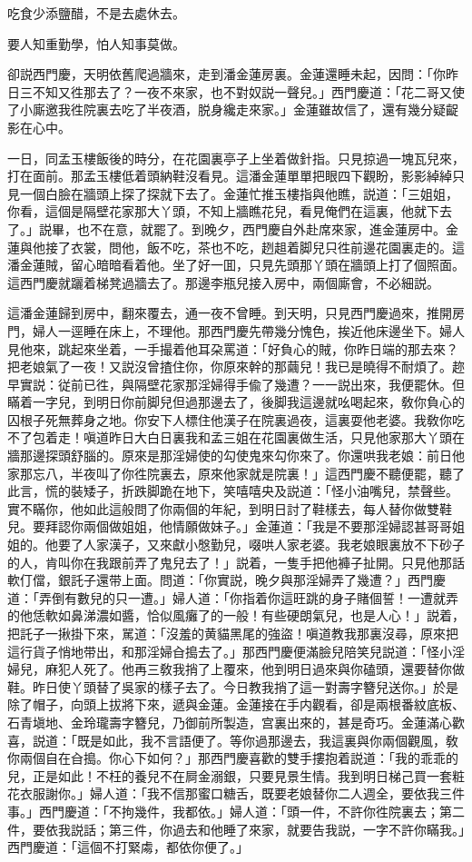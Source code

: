 \begin{myquote}
吃食少添鹽醋，不是去處休去。

要人知重勤學，怕人知事莫做。
\end{myquote}

卻説西門慶，天明依舊爬過牆來，走到潘金蓮房裏。金蓮還睡未起，因問：「你昨日三不知又徃那去了？一夜不來家，也不對奴説一聲兒。」西門慶道：「花二哥又使了小廝邀我徃院裏去吃了半夜酒，脱身纔走來家。」金蓮雖故信了，還有幾分疑齪影在心中。

一日，同孟玉樓飯後的時分，在花園裏亭子上坐着做針指。只見掠過一塊瓦兒來，打在面前。那孟玉樓低着頭納鞋沒看見。這潘金蓮單單把眼四下觀盼，影影綽綽只見一個白臉在牆頭上探了探就下去了。金蓮忙推玉樓指與他瞧，説道：「三姐姐，你看，這個是隔壁花家那大丫頭，不知上牆瞧花兒，看見俺們在這裏，他就下去了。」説畢，也不在意，就罷了。到晚夕，西門慶自外赴席來家，進金蓮房中。金蓮與他接了衣裳，問他，飯不吃，茶也不吃，趔趄着脚兒只徃前邊花園裏走的。這潘金蓮賊，留心暗暗看着他。坐了好一囬，只見先頭那丫頭在牆頭上打了個照面。這西門慶就躧着梯凳過牆去了。那邊李瓶兒接入房中，兩個廝會，不必細説。

這潘金蓮歸到房中，翻來覆去，通一夜不曾睡。到天明，只見西門慶過來，推開房門，婦人一逕睡在床上，不理他。那西門慶先帶幾分愧色，挨近他床邊坐下。婦人見他來，跳起來坐着，一手撮着他耳朶罵道：「好負心的賊，你昨日端的那去來？把老娘氣了一夜！又説沒曾揸住你，你原來幹的那繭兒！我已是曉得不耐煩了。趂早實説：従前已徃，與隔壁花家那淫婦得手偸了幾遭？一一説出來，我便罷休。但瞞着一字兒，到明日你前脚兒但過那邊去了，後脚我這邊就吆喝起來，敎你負心的囚根子死無葬身之地。你安下人標住他漢子在院裏過夜，這裏耍他老婆。我敎你吃不了包着走！嗔道昨日大白日裏我和孟三姐在花園裏做生活，只見他家那大丫頭在牆那邊探頭舒腦的。原來是那淫婦使的勾使鬼來勾你來了。你還哄我老娘：前日他家那忘八，半夜叫了你徃院裏去，原來他家就是院裏！」這西門慶不聽便罷，聽了此言，慌的裝矮子，折跌脚跪在地下，笑嘻嘻央及説道：「怪小油嘴兒，禁聲些。實不瞞你，他如此這般問了你兩個的年紀，到明日討了鞋樣去，每人替你做雙鞋兒。要拜認你兩個做姐姐，他情願做妹子。」金蓮道：「我是不要那淫婦認甚哥哥姐姐的。他要了人家漢子，又來獻小慇勤兒，啜哄人家老婆。我老娘眼裏放不下砂子的人，肯叫你在我跟前弄了鬼兒去了！」説着，一隻手把他褲子扯開。只見他那話軟仃儅，銀託子還带上面。問道：「你實説，晚夕與那淫婦弄了幾遭？」西門慶道：「弄倒有數兒的只一遭。」婦人道：「你指着你這旺跳的身子賭個誓！一遭就弄的他恁軟如鼻涕濃如醬，恰似風癱了的一般！有些硬朗氣兒，也是人心！」説着，把託子一揪掛下來，駡道：「沒羞的黄貓黑尾的強盜！嗔道教我那裏沒尋，原來把這行貨子悄地带出，和那淫婦㒲搗去了。」那西門慶便滿臉兒陪笑兒説道：「怪小淫婦兒，麻犯人死了。他再三敎我捎了上覆來，他到明日過來與你磕頭，還要替你做鞋。昨日使丫頭替了吳家的樣子去了。今日教我捎了這一對壽字簪兒送你。」於是除了帽子，向頭上拔將下來，遞與金蓮。金蓮接在手内觀看，卻是兩根番紋底板、石青塡地、金玲瓏壽字簪兒，乃御前所製造，宫裏出來的，甚是奇巧。金蓮滿心歡喜，説道：「既是如此，我不言語便了。等你過那邊去，我這裏與你兩個觀風，敎你兩個自在㒲搗。你心下如何？」那西門慶喜歡的雙手摟抱着説道：「我的乖乖的兒，正是如此！不枉的養兒不在屙金溺銀，只要見景生情。我到明日梯己買一套粧花衣服謝你。」婦人道：「我不信那蜜口糖舌，既要老娘替你二人週全，要依我三件事。」西門慶道：「不拘幾件，我都依。」婦人道：「頭一件，不許你徃院裏去；第二件，要依我説話；第三件，你過去和他睡了來家，就要告我説，一字不許你瞞我。」西門慶道：「這個不打緊䖏，都依你便了。」

